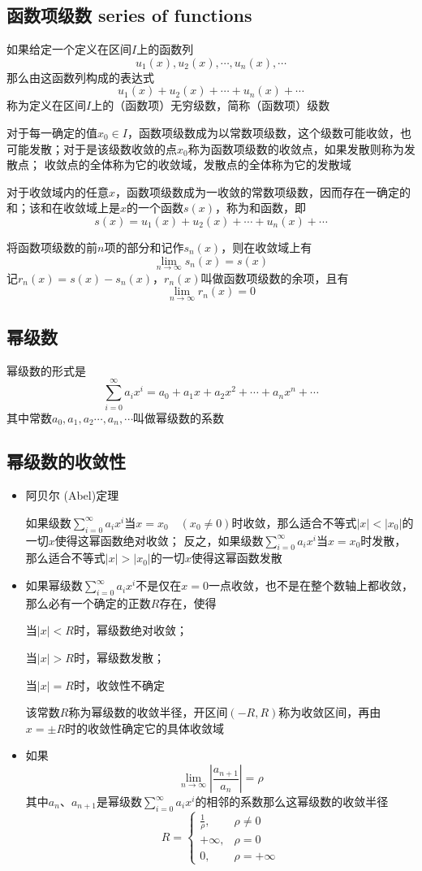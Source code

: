 \documentclass[UTF8]{ctexart}
\newcommand{\abs}[1]{{\left|{#1}\right|}}
\begin{document}
\subsection*{函数项级数 series of functions}

如果给定一个定义在区间$I$上的函数列
\[u_1(x),u_2(x),\cdots,u_n(x),\cdots\]
那么由这函数列构成的表达式
\[u_1(x)+u_2(x)+\cdots+u_n(x)+\cdots\]
称为定义在区间$I$上的（函数项）无穷级数，简称（函数项）级数

对于每一确定的值$x_0\in I$，函数项级数成为以常数项级数，这个级数可能收敛，也可能发散；对于是该级数收敛的点$x_0$称为函数项级数的收敛点，如果发散则称为发散点；
收敛点的全体称为它的收敛域，发散点的全体称为它的发散域

对于收敛域内的任意$x$，函数项级数成为一收敛的常数项级数，因而存在一确定的和；该和在收敛域上是$x$的一个函数$s(x)$，称为和函数，即
\[s(x)=u_1(x)+u_2(x)+\cdots+u_n(x)+\cdots\]

将函数项级数的前$n$项的部分和记作$s_n(x)$，则在收敛域上有
\[\lim_{n\to\infty}s_n(x)=s(x)\]
记$r_n(x)=s(x)-s_n(x)$，$r_n(x)$叫做函数项级数的余项，且有
\[\lim_{n\to\infty}r_n(x)=0\]

\subsection*{幂级数}
幂级数的形式是
\[\sum_{i=0}^\infty a_ix^i=a_0+a_1x+a_2x^2+\cdots+a_nx^n+\cdots\]
其中常数$a_0,a_1,a_2\cdots,a_n,\cdots$叫做幂级数的系数

\subsection*{幂级数的收敛性}
\begin{itemize}
  \item 阿贝尔 (Abel)定理

  如果级数$\displaystyle\sum_{i=0}^\infty a_ix^i$当$x=x_0\quad(x_0\ne0)$时收敛，那么适合不等式$\abs{x}<\abs{x_0}$的一切$x$使得这幂函数绝对收敛；
  反之，如果级数$\displaystyle\sum_{i=0}^\infty a_ix^i$当$x=x_0$时发散，那么适合不等式$\abs{x}>\abs{x_0}$的一切$x$使得这幂函数发散

  \item 如果幂级数$\displaystyle\sum_{i=0}^\infty a_ix^i$不是仅在$x=0$一点收敛，也不是在整个数轴上都收敛，那么必有一个确定的正数$R$存在，使得

  当$\abs{x}<R$时，幂级数绝对收敛；

  当$\abs{x}>R$时，幂级数发散；

  当$\abs{x}=R$时，收敛性不确定

  该常数$R$称为幂级数的收敛半径，开区间$(-R,R)$称为收敛区间，再由$x=\pm R$时的收敛性确定它的具体收敛域

  \item 如果
  \[ \lim_{n\to\infty}\abs{\frac{a_{n+1}}{a_n}}=\rho \]
  其中$a_n$、$a_{n+1}$是幂级数$\displaystyle\sum_{i=0}^\infty a_ix^i$的相邻的系数那么这幂级数的收敛半径
  \[R=\begin{cases}
  \frac{1}{\rho},&\rho\ne0\\
  +\infty,&\rho=0\\
  0,&\rho=+\infty
  \end{cases}\]
\end{itemize}
\end{document}

